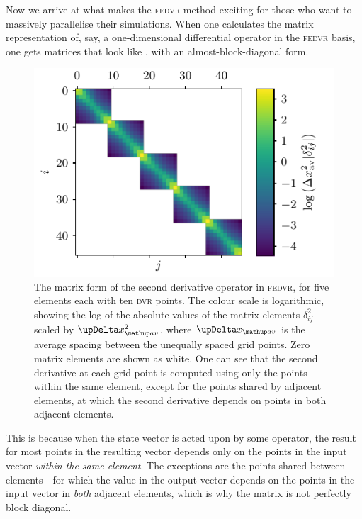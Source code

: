 Now we arrive at what makes the \textsc{fedvr} method exciting for those who want to massively parallelise their simulations. When one calculates the matrix representation of, say, a one-dimensional differential operator in the \textsc{fedvr} basis, one gets matrices that look like , with an almost-block-diagonal form.

\begin{figure}[t]
    \centerfloat
    \includegraphics{figures/numerics/fedvr_D2_operator.pdf}
    \caption{The matrix form of the second derivative operator in \textsc{fedvr}, for five elements each with ten \textsc{dvr} points. The colour scale is logarithmic, showing the log of the absolute values of the matrix elements $\delta^2_{ij}$ scaled by $\upDelta x_\up{av}^2$, where $\upDelta x_\up{av}$ is the average spacing between the unequally spaced grid points. Zero matrix elements are shown as white. One can see that the second derivative at each grid point is computed using only the points within the same element, except for the points shared by adjacent elements, at which the second derivative depends on points in both adjacent elements.}
    \label{fig:fedvr_D2_operator}
\end{figure}

 This is because when the state vector is acted upon by some operator, the result for most points in the resulting vector depends only on the points in the input vector \emph{within the same element}. The exceptions are the points shared between elements---for which the value in the output vector depends on the points in the input vector in \emph{both} adjacent elements, which is why the matrix is not perfectly block diagonal.

